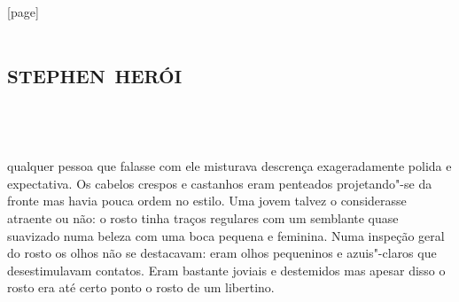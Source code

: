 
[page]
\renewcommand\footnote[2][\stepcounter{symbol}]{#1\NoCaseChange{\Footnote{{\normalsize\fnsymbol{symbol}}}{#2}}}



\part{\textsc{stephen herói}}




\chapter*{\ } 

{
\par}
\bigskip

\noindent qualquer pessoa que falasse com ele misturava descrença exageradamente
polida e expectativa.  \label{os"-cabelos} Os cabelos crespos e castanhos eram
penteados projetando"-se da fronte mas havia pouca ordem no estilo. 
Uma jovem talvez o considerasse atraente ou não: o rosto tinha
traços regulares com um semblante quase suavizado numa beleza com uma boca pequena e
feminina. Numa inspeção geral do
rosto os olhos não se destacavam: eram olhos pequeninos e azuis"-claros
que desestimulavam contatos.  Eram bastante joviais e destemidos mas
apesar disso o rosto era até certo ponto o rosto de um libertino.

